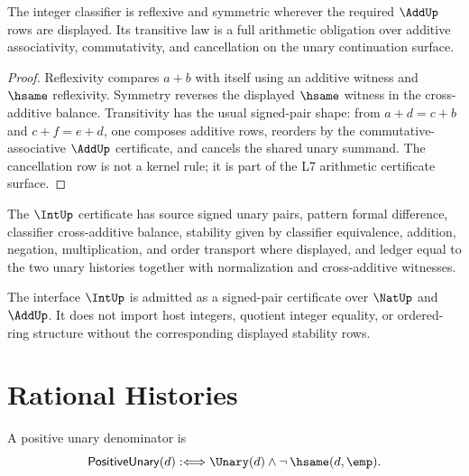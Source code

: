 \begin{theorem}
\label{thm:arithmetic-spine-int-classifier-elementary}
The integer classifier is reflexive and symmetric wherever the required
$\AddUp$ rows are displayed.  Its transitive law is a full arithmetic
obligation over additive associativity, commutativity, and cancellation on
the unary continuation surface.
\end{theorem}

\begin{proof}
Reflexivity compares $a+b$ with itself using an additive witness and
$\hsame$ reflexivity.  Symmetry reverses the displayed $\hsame$ witness in
the cross-additive balance.  Transitivity has the usual signed-pair shape:
from $a+d=c+b$ and $c+f=e+d$, one composes additive rows, reorders by the
commutative-associative $\AddUp$ certificate, and cancels the shared unary
summand.  The cancellation row is not a kernel rule; it is part of the L7
arithmetic certificate surface.
\end{proof}

\begin{definition}
\label{def:arithmetic-spine-int-namecert}
The $\IntUp$ certificate has source signed unary pairs, pattern formal
difference, classifier cross-additive balance, stability given by classifier
equivalence, addition, negation, multiplication, and order transport where
displayed, and ledger equal to the two unary histories together with
normalization and cross-additive witnesses.
\end{definition}

\begin{corollary}
\label{cor:arithmetic-spine-int-admission}
The interface $\IntUp$ is admitted as a signed-pair certificate over
$\NatUp$ and $\AddUp$.  It does not import host integers, quotient integer
equality, or ordered-ring structure without the corresponding displayed
stability rows.
\end{corollary}

\section{Rational Histories}
\label{sec:arithmetic-spine-rat}

\begin{definition}
\label{def:arithmetic-spine-positive-unary}
A positive unary denominator is
$$
\mathsf{PositiveUnary}(d)
:\Longleftrightarrow
\Unary(d)\wedge\neg\,\hsame(d,\emp).
$$
\end{definition}

